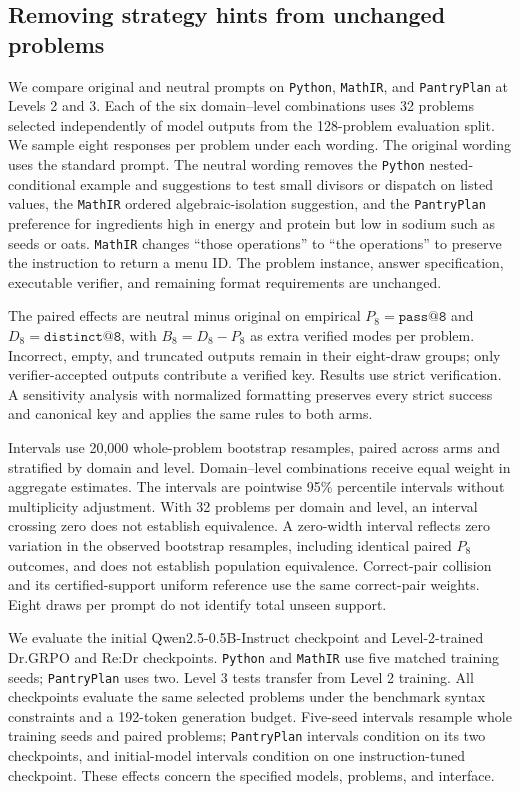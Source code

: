 \subsection{Removing strategy hints from unchanged problems}

\label{sec:prompt-hint-ablation}

We compare original and neutral prompts on \texttt{Python}, \texttt{MathIR}, and \texttt{PantryPlan} at Levels 2 and 3. Each of the six domain--level combinations uses 32 problems selected independently of model outputs from the 128-problem evaluation split. We sample eight responses per problem under each wording. The original wording uses the standard prompt. The neutral wording removes the \texttt{Python} nested-conditional example and suggestions to test small divisors or dispatch on listed values, the \texttt{MathIR} ordered algebraic-isolation suggestion, and the \texttt{PantryPlan} preference for ingredients high in energy and protein but low in sodium such as seeds or oats. \texttt{MathIR} changes ``those operations'' to ``the operations'' to preserve the instruction to return a menu ID. The problem instance, answer specification, executable verifier, and remaining format requirements are unchanged.

The paired effects are neutral minus original on empirical $P_8=\texttt{pass@8}$ and $D_8=\texttt{distinct@8}$, with $B_8=D_8-P_8$ as extra verified modes per problem. Incorrect, empty, and truncated outputs remain in their eight-draw groups; only verifier-accepted outputs contribute a verified key. Results use strict verification. A sensitivity analysis with normalized formatting preserves every strict success and canonical key and applies the same rules to both arms.

Intervals use 20,000 whole-problem bootstrap resamples, paired across arms and stratified by domain and level. Domain--level combinations receive equal weight in aggregate estimates. The intervals are pointwise 95\% percentile intervals without multiplicity adjustment. With 32 problems per domain and level, an interval crossing zero does not establish equivalence. A zero-width interval reflects zero variation in the observed bootstrap resamples, including identical paired $P_8$ outcomes, and does not establish population equivalence. Correct-pair collision and its certified-support uniform reference use the same correct-pair weights. Eight draws per prompt do not identify total unseen support.



We evaluate the initial Qwen2.5-0.5B-Instruct checkpoint and Level-2-trained Dr.GRPO and Re:Dr checkpoints. \texttt{Python} and \texttt{MathIR} use five matched training seeds; \texttt{PantryPlan} uses two. Level 3 tests transfer from Level 2 training. All checkpoints evaluate the same selected problems under the benchmark syntax constraints and a 192-token generation budget. Five-seed intervals resample whole training seeds and paired problems; \texttt{PantryPlan} intervals condition on its two checkpoints, and initial-model intervals condition on one instruction-tuned checkpoint. These effects concern the specified models, problems, and interface.


